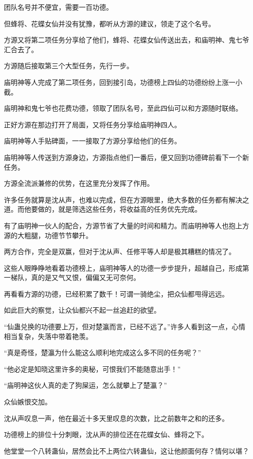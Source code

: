 \begin{this_body}
团队名号并不便宜，需要一百功德。

但蜂将、花蝶女仙并没有犹豫，都听从方源的建议，领走了这个名号。

方源又将第二项任务分享给了他们，蜂将、花蝶女仙传送出去，和庙明神、鬼七爷汇合去了。

方源随后接取第三个大型任务，先行一步。

庙明神等人完成了第二项任务，回到接引岛，功德榜上四仙的功德纷纷上涨一小截。

庙明神和鬼七爷也花费功德，领取了团队名号，至此四仙可以和方源随时联络。

正好方源在那边打开了局面，又将任务分享给庙明神四人。

庙明神等人手贴碑面，一一接取了方源分享给他们的任务。

庙明神等人传送到方源身边，方源指点他们一番后，便又回到功德碑前看下一个新任务。

方源全流派兼修的优势，在这里充分发挥了作用。

许多任务就算是沈从声，也难以完成，但在方源眼里，绝大多数的任务都有解决之道。而他要做的，就是筛选这些任务，将收益高的任务优先完成。

有了庙明神一伙人的配合，方源节省了大量的时间和精力。而庙明神等人也抱上方源的大粗腿，功德节节攀升。

两方合作，完全是双赢，但对于沈从声、任修平等人却是极其糟糕的情况了。

这些人眼睁睁地看着功德榜上，庙明神等人的功德一步步提升，超越自己，形成第一梯队，真的是又气又恨，偏偏又无可奈何。

再看看方源的功德，已经积累了数千！可谓一骑绝尘，把众仙都甩得远远。

如此巨大的察觉，让众仙都兴不起一丝追赶的欲望。

“仙蛊兑换的功德要上万，但对楚瀛而言，已经不远了。”许多人看到这一点，心情相当复杂，失落中带着艳羡。

“真是奇怪，楚瀛为什么能这么顺利地完成这么多不同的任务呢？”

“他必定是知晓这里许多的奥秘，可恨我们不能随意出手！”

“庙明神这伙人真的走了狗屎运，怎么就攀上了楚瀛？”

众仙嫉恨交加。

沈从声叹息一声，他在最近十多天里叹息的次数，比之前数年之和的还多。

功德榜上的排位十分刺眼，沈从声的排位还在花蝶女仙、蜂将之下。

他堂堂一个八转蛊仙，居然会比不上两位六转蛊仙，这让他颜面何存？情何以堪？


\end{this_body}
